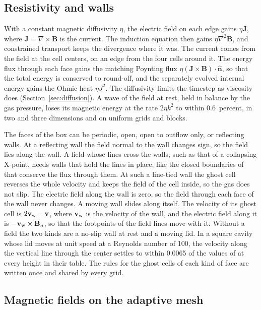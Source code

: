 \documentclass[twocolumn]{aastex701}
\begin{document}
\subsection{Resistivity and walls}
\label{sec:resistivity}

With a constant magnetic diffusivity $\eta$, the electric field on each edge gains $\eta\mathbf{J}$, where $\mathbf{J} = \nabla\times\mathbf{B}$ is the current. The induction equation then gains $\eta\nabla^2\mathbf{B}$, and constrained transport keeps the divergence where it was. The current comes from the field at the cell centers, on an edge from the four cells around it. The energy flux through each face gains the matching Poynting flux $\eta(\mathbf{J}\times\mathbf{B})\cdot\hat{\mathbf{n}}$, so that the total energy is conserved to round-off, and the separately evolved internal energy gains the Ohmic heat $\eta J^2$. The diffusivity limits the timestep as viscosity does (Section~\ref{sec:diffusion}). A wave of the field at rest, held in balance by the gas pressure, loses its magnetic energy at the rate $2\eta k^2$ to within 0.6~percent, in two and three dimensions and on uniform grids and blocks.

The faces of the box can be periodic, open, open to outflow only, or reflecting walls. At a reflecting wall the field normal to the wall changes sign, so the field lies along the wall. A field whose lines cross the walls, such as that of a collapsing X-point, needs walls that hold the lines in place, like the closed boundaries of \citet{Thurgood2018} that conserve the flux through them. At such a line-tied wall the ghost cell reverses the whole velocity and keeps the field of the cell inside, so the gas does not slip. The electric field along the wall is zero, so the field through each face of the wall never changes. A moving wall slides along itself. The velocity of its ghost cell is $2\mathbf{v}_{\rm w} - \mathbf{v}$, where $\mathbf{v}_{\rm w}$ is the velocity of the wall, and the electric field along it is $-\mathbf{v}_{\rm w}\times\mathbf{B}_n$, so that the footpoints of the field lines move with it. Without a field the two kinds are a no-slip wall at rest and a moving lid. In a square cavity whose lid moves at unit speed at a Reynolds number of 100, the velocity along the vertical line through the center settles to within 0.0065 of the values of \citet{Ghia1982} at every height in their table. The rules for the ghost cells of each kind of face are written once and shared by every grid.

\subsection{Magnetic fields on the adaptive mesh}
\label{sec:mhdamr}
\end{document}
